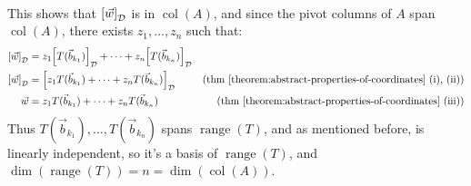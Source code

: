 \documentclass[11pt, letterpaper]{report}
\newenvironment{book}{}{}
\let\originalleft\left
\let\originalright\right
\renewcommand{\left}{\mathopen{}\mathclose\bgroup\originalleft}
\renewcommand{\right}{\aftergroup\egroup\originalright}
\newcounter{theorem}[chapter]
\DeclareMathOperator{\col}{col}
\DeclareMathOperator{\range}{range}
\begin{document}
\begin{book}
\begin{align*}
\end{align*}
This shows that $\left[ \vec{w} \right]_{\mathcal{D}}$ is in $\col(A)$, and since the pivot columns of $A$ span $\col(A)$, there exists $z_1,\ldots,z_n$ such that:
\begin{align*}
\left[\vec{w}\right]_{\mathcal{D}} &= z_1 \left[ T(\vec{b}_{k_1}) \right]_{\mathcal{D}} + \cdots + z_n \left[ T(\vec{b}_{k_n}) \right]_{\mathcal{D}} \\
\left[\vec{w}\right]_{\mathcal{D}} &=\left[ z_1 T(\vec{b}_{k_1}) + \cdots + z_n  T(\vec{b}_{k_n}) \right]_{\mathcal{D}} &\text{(thm \ref{theorem:abstract-properties-of-coordinates} (i), (ii))}\\
\vec{w} &= z_1T(\vec{b}_{k_1}) + \cdots + z_n T(\vec{b}_{k_n}) &\text{(thm \ref{theorem:abstract-properties-of-coordinates} (iii))}
\end{align*}
Thus $T(\vec{b}_{k_1}), \ldots, T(\vec{b}_{k_n})$ spans $\range(T)$, and as mentioned before, is linearly independent, so it's a basis of $\range(T)$, and $\dim(\range(T)) = n = \dim(\col(A))$.


\end{book}
\end{document}
